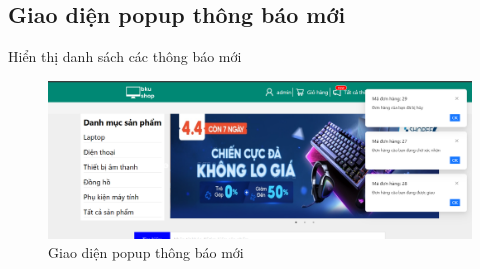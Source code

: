 \subsection{Giao diện popup thông báo mới}
\noindent Hiển thị danh sách các thông báo mới
\begin{figure}[H]
    \begin{center}
    \includegraphics[scale=0.35]{images/hieu/chap-5/popup.png}
    \vspace*{3mm}
    \caption{Giao diện popup thông báo mới}
    \end{center}
\end{figure}
